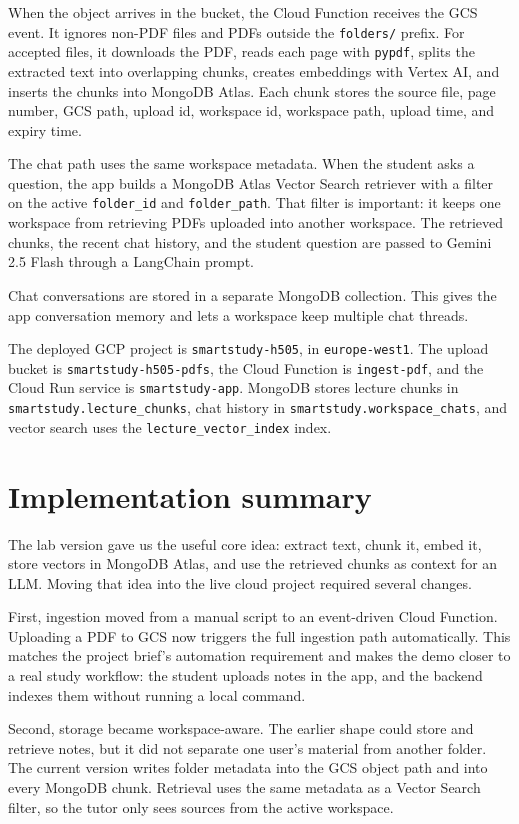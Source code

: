 \documentclass[11pt,a4paper]{article}
\begin{document}
When the object arrives in the bucket, the Cloud Function receives the GCS event. It ignores non-PDF files and PDFs outside the \texttt{folders/} prefix. For accepted files, it downloads the PDF, reads each page with \texttt{pypdf}, splits the extracted text into overlapping chunks, creates embeddings with Vertex AI, and inserts the chunks into MongoDB Atlas. Each chunk stores the source file, page number, GCS path, upload id, workspace id, workspace path, upload time, and expiry time.

The chat path uses the same workspace metadata. When the student asks a question, the app builds a MongoDB Atlas Vector Search retriever with a filter on the active \texttt{folder\_id} and \texttt{folder\_path}. That filter is important: it keeps one workspace from retrieving PDFs uploaded into another workspace. The retrieved chunks, the recent chat history, and the student question are passed to Gemini 2.5 Flash through a LangChain prompt.

Chat conversations are stored in a separate MongoDB collection. This gives the app conversation memory and lets a workspace keep multiple chat threads.

The deployed GCP project is \texttt{smartstudy-h505}, in \texttt{europe-west1}. The upload bucket is \texttt{smartstudy-h505-pdfs}, the Cloud Function is \texttt{ingest-pdf}, and the Cloud Run service is \texttt{smartstudy-app}. MongoDB stores lecture chunks in \texttt{smartstudy.lecture\_chunks}, chat history in \texttt{smartstudy.workspace\_chats}, and vector search uses the \texttt{lecture\_vector\_index} index.

\section*{Implementation summary}

The lab version gave us the useful core idea: extract text, chunk it, embed it, store vectors in MongoDB Atlas, and use the retrieved chunks as context for an LLM. Moving that idea into the live cloud project required several changes.

First, ingestion moved from a manual script to an event-driven Cloud Function. Uploading a PDF to GCS now triggers the full ingestion path automatically. This matches the project brief's automation requirement and makes the demo closer to a real study workflow: the student uploads notes in the app, and the backend indexes them without running a local command.

Second, storage became workspace-aware. The earlier shape could store and retrieve notes, but it did not separate one user's material from another folder. The current version writes folder metadata into the GCS object path and into every MongoDB chunk. Retrieval uses the same metadata as a Vector Search filter, so the tutor only sees sources from the active workspace.
\end{document}

